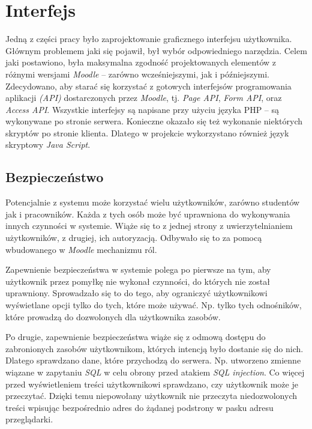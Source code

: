 \section{Interfejs}
\label{Chapter65}

Jedną z części pracy było zaprojektowanie graficznego interfejsu użytkownika. Głównym problemem jaki się pojawił, był wybór odpowiedniego narzędzia. Celem jaki postawiono, była maksymalna zgodność projektowanych elementów z różnymi wersjami \emph{Moodle} -- zarówno wcześniejszymi, jak i późniejszymi. Zdecydowano, aby starać się korzystać z gotowych interfejsów programowania aplikacji \emph{(API)} dostarczonych przez \emph{Moodle}, tj. \emph{Page API}, \emph{Form API}, oraz \emph{Access API}. Wszystkie interfejsy są napisane przy użyciu języka PHP -- są wykonywane po stronie serwera. Konieczne okazało się też wykonanie niektórych skryptów po stronie klienta. Dlatego w projekcie wykorzystano również język skryptowy \emph{Java Script}.

\subsection{Bezpieczeństwo}

Potencjalnie z systemu może korzystać wielu użytkowników, zarówno studentów jak i pracowników. Każda z tych osób może być uprawniona do wykonywania innych czynności w systemie. Wiąże się to z jednej strony z uwierzytelnianiem użytkowników, z drugiej, ich autoryzacją. Odbywało się to za pomocą wbudowanego w \emph{Moodle} mechanizmu ról.

Zapewnienie bezpieczeństwa w systemie polega po pierwsze na tym, aby użytkownik przez pomyłkę nie wykonał czynności, do których nie został uprawniony. Sprowadzało się to do tego, aby ograniczyć użytkownikowi wyświetlane opcji tylko do tych, które może używać. Np. tylko tych odnośników, które prowadzą do dozwolonych dla użytkownika zasobów.

Po drugie, zapewnienie bezpieczeństwa wiąże się z odmową dostępu do zabronionych zasobów użytkownikom, których intencją było dostanie się do nich. Dlatego sprawdzano dane, które przychodzą do serwera. Np. utworzeno zmienne wiązane w zapytaniu \emph{SQL} w celu obrony przed atakiem \emph{SQL injection}. Co więcej przed wyświetleniem treści użytkownikowi sprawdzano, czy użytkownik może je przeczytać. Dzięki temu niepowołany użytkownik nie przeczyta niedozwolonych treści wpisując bezpośrednio adres do żądanej podstrony w pasku adresu przeglądarki.